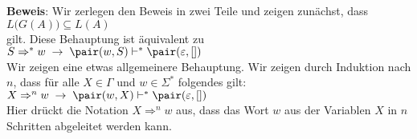 \noindent
\textbf{Beweis}:
Wir zerlegen den Beweis in zwei Teile und zeigen zun\"achst, dass
\\[0.2cm]
\hspace*{1.3cm}
$L\bigl(G(A)\bigr) \subseteq L(A)$
\\[0.2cm]
gilt.  Diese Behauptung ist \"aquivalent zu
\\[0.2cm]
\hspace*{1.3cm}
$S \Rightarrow^* w \;\rightarrow\; \pair(w,S) \vdash^* \pair(\varepsilon, [])$
\\[0.2cm]
Wir zeigen eine etwas allgemeinere Behauptung.  Wir zeigen durch Induktion nach $n$, dass
f\"ur alle $X \in \Gamma$ und $w \in \Sigma^*$ folgendes gilt:
\\[0.2cm]
\hspace*{1.3cm}
$X \Rightarrow^n w \;\rightarrow\; \pair(w,X) \vdash^* \pair(\varepsilon, [])$
\\[0.2cm]
Hier dr\"uckt die Notation $X \Rightarrow^n w$ aus, dass das Wort $w$ aus der Variablen $X$ 
in $n$ Schritten abgeleitet werden kann.  
